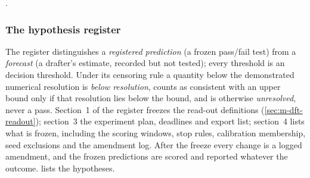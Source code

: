 . %

\subsubsection{The hypothesis register}
\label{sec:m-reg-register}

The register distinguishes a \emph{registered prediction} (a frozen pass/fail test) from a \emph{forecast} (a
drafter's estimate, recorded but not tested); every threshold is an  decision threshold. %
Under its censoring rule a quantity below the demonstrated numerical resolution is \emph{below resolution}, counts as
consistent with an upper bound only if that resolution lies below the bound, and is otherwise \emph{unresolved}, never
a pass. %
Section~1 of the register freezes the read-out definitions (\cref{sec:m-dft-readout}); section~3 the experiment plan,
deadlines and export list; section~4 lists what is frozen, including the scoring windows, stop rules, calibration
membership, seed exclusions and the amendment log. %
After the freeze every change is a logged amendment, and the frozen predictions are scored and reported whatever the
outcome. %
 lists the hypotheses.

